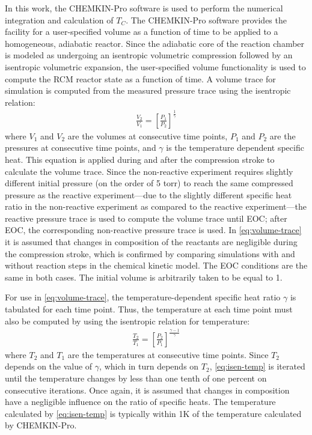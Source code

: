 \documentclass[../main.tex]{subfiles}
\begin{document}
In this work, the CHEMKIN-Pro \cite{Chemkin2012} software is used to
perform the numerical integration and calculation of $T_C$. The
CHEMKIN-Pro software provides the facility for a user-specified
volume as a function of time to be applied to a homogeneous,
adiabatic reactor. Since the adiabatic core of the reaction chamber
is modeled as undergoing an isentropic volumetric compression followed
by an isentropic volumetric expansion, the user-specified volume
functionality is used to compute the RCM reactor state as a function
of time. A volume trace for simulation is computed from the measured
pressure trace using the isentropic relation:
%
\begin{align}
\frac{V_2}{V_1} = \left[\frac{P_1}{P_2}\right]^{\frac{1}{\gamma}}
\label{eq:volume-trace}
\end{align}
%
where $V_1$ and $V_2$ are the volumes at consecutive time points,
$P_1$ and $P_2$ are the pressures at consecutive time points, and
$\gamma$ is the temperature dependent specific heat. This equation
is applied during and after the compression stroke to calculate
the volume trace. Since the non-reactive experiment requires slightly
different initial pressure (on the order of 5 torr) to reach the same
compressed pressure as the reactive experiment---due to the slightly
different specific heat ratio in the non-reactive experiment as compared
to the reactive experiment---the reactive pressure trace is used to
compute the volume trace until EOC; after EOC, the corresponding
non-reactive pressure trace is used. In \cref{eq:volume-trace} it is assumed that
changes in composition of the reactants are negligible during the
compression stroke, which is confirmed by comparing simulations with and
without reaction steps in the chemical kinetic model. The EOC conditions
are the same in both cases. The initial volume is arbitrarily taken
to be equal to 1.

For use in \cref{eq:volume-trace}, the temperature-dependent specific
heat ratio $\gamma$ is tabulated for each time point. Thus, the
temperature at each time point must also be computed by using the
isentropic relation for temperature:
%
\begin{align}
\frac{T_2}{T_1} = \left[\frac{P_2}{P_1}\right]^{\frac{\gamma-1}{\gamma}}
\label{eq:isen-temp}
\end{align}
%
where $T_2$ and $T_1$ are the temperatures at consecutive time points.
Since $T_2$ depends on the value of $\gamma$, which in turn depends
on $T_2$, \cref{eq:isen-temp} is iterated until the temperature
changes by less than one tenth of one percent on consecutive iterations.
Once again, it is assumed that changes in composition have a negligible
influence on the ratio of specific heats.
The temperature calculated by \cref{eq:isen-temp} is typically within
1K of the temperature calculated by CHEMKIN-Pro.
\end{document}

